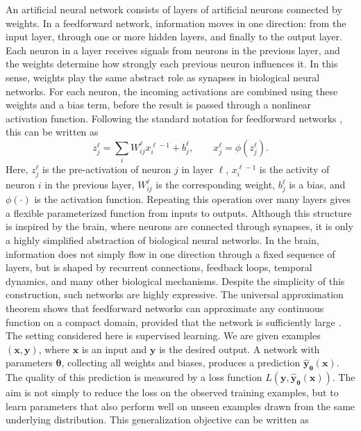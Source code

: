 An artificial neural network consists of layers of artificial neurons connected by weights. In a feedforward network, information moves in one direction: from the input layer, through one or more hidden layers, and finally to the output layer. Each neuron in a layer receives signals from neurons in the previous layer, and the weights determine how strongly each previous neuron influences it. In this sense, weights play the same abstract role as synapses in biological neural networks. For each neuron, the incoming activations are combined using these weights and a bias term, before the result is passed through a nonlinear activation function. Following the standard notation for feedforward networks \parencite{goodfellow_deep_2016}, this can be written as
\begin{equation}
    z_j^\ell = \sum_i W_{ij}^\ell x_i^{\ell-1} + b_j^\ell,
    \qquad
    x_j^\ell = \phi(z_j^\ell).
    \label{eq:feedforward}
\end{equation}
Here, \(z_j^\ell\) is the pre-activation of neuron \(j\) in layer \(\ell\), \(x_i^{\ell-1}\) is the activity of neuron \(i\) in the previous layer, \(W_{ij}^\ell\) is the corresponding weight, \(b_j^\ell\) is a bias, and \(\phi(\cdot)\) is the activation function. Repeating this operation over many layers gives a flexible parameterized function from inputs to outputs. Although this structure is inspired by the brain, where neurons are connected through synapses, it is only a highly simplified abstraction of biological neural networks. In the brain, information does not simply flow in one direction through a fixed sequence of layers, but is shaped by recurrent connections, feedback loops, temporal dynamics, and many other biological mechanisms. Despite the simplicity of this construction, such networks are highly expressive. The universal approximation theorem shows that feedforward networks can approximate any continuous function on a compact domain, provided that the network is sufficiently large \parencite{hornik_approximation_1991}. The setting considered here is supervised learning. We are given examples \((\mathbf{x},\mathbf{y})\), where \(\mathbf{x}\) is an input and \(\mathbf{y}\) is the desired output. A network with parameters \(\boldsymbol{\theta}\), collecting all weights and biases, produces a prediction \(\hat{\mathbf{y}}_{\boldsymbol{\theta}}(\mathbf{x})\). The quality of this prediction is measured by a loss function \(L(\mathbf{y},\hat{\mathbf{y}}_{\boldsymbol{\theta}}(\mathbf{x}))\). The aim is not simply to reduce the loss on the observed training examples, but to learn parameters that also perform well on unseen examples drawn from the same underlying distribution. This generalization objective can be written as
